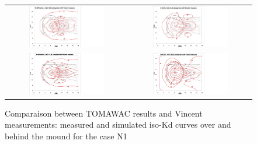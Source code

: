 \begin{figure}[H]
  \centering
\begin{tabular}{cc}
    \includegraphics[width=0.65\textwidth]{iso-Kd_nodiff_dx035.jpg}& \hspace{-3cm}
    \includegraphics[width=0.65\textwidth]{iso-Kd_cr004-dx035.jpg}\\
    \includegraphics[width=0.65\textwidth]{iso-Kd_nodiff_dx018.jpg}& \hspace{-3cm}
    \includegraphics[width=0.65\textwidth]{iso-Kd_cr0015_dx018.jpg}\\
\end{tabular}
\caption{Comparaison between TOMAWAC results and Vincent measurements: measured and simulated iso-Kd curves over and behind the mound for the case N1}
\label {comparisonN1}
\end{figure}


